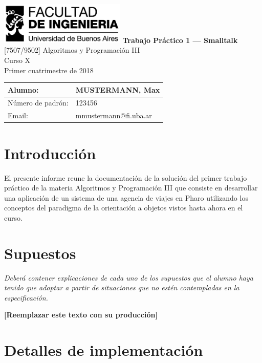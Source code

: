 \documentclass[titlepage,a4paper]{article}
\begin{document}
\begin{titlepage} %
	\hfill\includegraphics[width=6cm]{logofiuba.jpg}
    \centering
    \vfill
    \Huge \textbf{Trabajo Práctico 1 — Smalltalk}
    \vskip2cm
    \Large [7507/9502] Algoritmos y Programación III\\
    Curso X \\ %
    Primer cuatrimestre de 2018 
    \vfill
    \begin{tabular}{ | l | l | } %
      \hline
      Alumno: & MUSTERMANN, Max \\ \hline
      Número de padrón: & 123456 \\ \hline
      Email: & mmustermann@fi.uba.ar \\ \hline
  	\end{tabular}
    \vfill
    \vfill
\end{titlepage}

\tableofcontents %
\newpage

\section{Introducción}\label{sec:intro}
El presente informe reune la documentación de la solución del primer trabajo práctico de la materia Algoritmos y Programación III que consiste en desarrollar una aplicación de un sistema de una agencia de viajes en Pharo utilizando los conceptos del paradigma de la orientación a objetos vistos hasta ahora en el curso.

\section{Supuestos}\label{sec:supuestos}
\textit{Deberá contener explicaciones de cada uno de los supuestos que el alumno haya tenido que adoptar a partir de situaciones que no estén contempladas en la especificación.}
\newline
\newline
\centerline{\textbf{[Reemplazar este texto con su producción]}}

\section{Detalles de implementación}\label{sec:implementacion}
\end{document}

